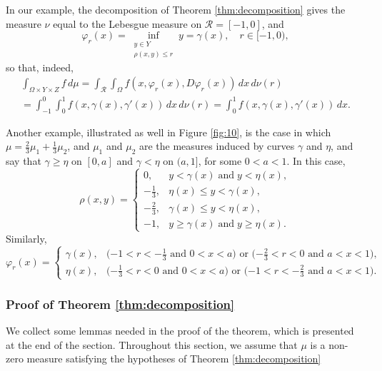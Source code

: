 \documentclass{article}
\theoremstyle{definition}
\theoremstyle{remark}
\begin{document}
 In our example, the decomposition of Theorem \ref{thm:decomposition} gives the measure $\nu$ equal to 
{the} Lebesgue measure on ${\mathcal R}=[-1,0]$, and 
 \[\varphi_{r}(x)=\inf_{\substack{y\in Y\\\rho(x,y)\leq r}}y=\gamma(x),\quad r\in [-1,0),\]
 so that, indeed,
 \begin{multline*}
  \int_{\Omega\times Y\times Z} f\,d\mu
  =\int_{{\mathcal R}}\int_\Omega f(x,\varphi_r(x),D\varphi_r(x))\,dx\,d\nu(r)\\
  =\int_{-1}^0\int_0^1 f(x,\gamma(x),\gamma'(x))\,dx\,d\nu(r)=\int_0^1 f(x,\gamma(x),\gamma'(x))\,dx.
 \end{multline*}
 
 Another example, illustrated as well in Figure \ref{fig:10}, is the case in which $\mu=\tfrac23\mu_1+\tfrac13\mu_2$, and $\mu_1$ and $\mu_2$ are the measures induced by curves $\gamma$ and $\eta$, and say that $\gamma\geq \eta$ on $[0,a]$ and $\gamma<\eta$ on $(a,1]$, for some $0<a<1$. In this case, 
 \[\rho(x,y)=\begin{cases}
  0,&y<\gamma(x)\;\textrm{and}\;y<\eta(x),\\
  -\tfrac13,&\eta(x)\leq y<\gamma(x),\\
  -\tfrac23, &\gamma(x)\leq y<\eta(x),\\
  -1,&y\geq \gamma(x)\;\textrm{and}\;y\geq\eta(x).
 \end{cases}
 \]
 Similarly,
 \[\varphi_r(x)=\begin{cases}
    \gamma(x),&\textrm{($-1<r<-\tfrac13$ and $0<x<a$) or ($-\tfrac23<r<0$ and $a<x<1$)},\\
    \eta(x),&\textrm{($-\tfrac13<r<0$ and $0<x<a$) or ($-1<r<-\tfrac23$ and $a<x<1$)}.
 \end{cases}
 \]

\subsubsection{Proof of Theorem \ref{thm:decomposition}}
\label{sec:proof}


We collect some lemmas needed in the proof of the theorem, which is presented at the end of the section.
Throughout this section, we assume that $\mu$ is a non-zero measure satisfying the hypotheses of Theorem \ref{thm:decomposition}
\end{document}

